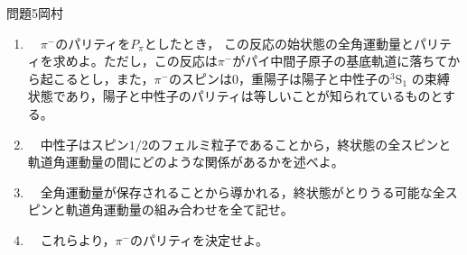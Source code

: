 \documentclass[fleqn]{jbook}
\begin{document}
\begin{question}{問題5}{岡村}
\begin{enumerate}
    \begin{enumerate}
    
    \item 　$\pi^-$のパリティを$P_\pi$としたとき，%
    この反応の始状態の全角運動量とパリティを求めよ。ただし，この反応は$\pi^-$がパイ中間子原子の基底軌道に落ちてから起こるとし，また，$\pi^-$のスピンは$0$，重陽子は陽子と中性子の${}^3$S${}_1$%
    の束縛状態であり，陽子と中性子のパリティは等しいことが知られているものとする。\\
    
    \item 　中性子はスピン$1/2$のフェルミ粒子であることから，終状態の全スピンと軌道角運動量の間にどのような関係があるかを述べよ。\\
    
    \item 　全角運動量が保存されることから導かれる，終状態がとりうる可能な全スピンと軌道角運動量の組み合わせを全て記せ。\\
    \item 　これらより，$\pi^-$のパリティを決定せよ。

\begin{figure}[hbt]
\begin{center}

\vfill
\end{center}
\end{figure}
\end{enumerate}

\end{enumerate}



\end{question}

\end{document}
